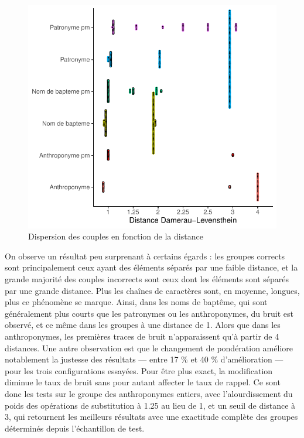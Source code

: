 \begin{figure}[ht] %
    \centering
    \includegraphics[scale=1.2]{3.Results/Img/Dotplot.pdf}
    \caption{Dispersion des couples en fonction de la distance}
    \label{graph_dispertion_cluster}
\end{figure}

On observe un résultat peu surprenant à certains égards : les groupes corrects sont principalement ceux ayant des éléments séparés par une faible distance, et la grande majorité des couples incorrects sont ceux dont les éléments sont séparés par une grande distance. 
Plus les chaînes de caractères sont, en moyenne, longues, plus ce phénomène se marque.
Ainsi, dans les noms de baptême, qui sont généralement plus courts que les patronymes ou les anthroponymes, du bruit est observé, et ce même dans les groupes à une distance de 1. Alors que dans les anthroponymes, les premières traces de bruit n'apparaissent qu’à partir de 4 distances.
Une autre observation est que le changement de pondération améliore notablement la justesse des résultats --- entre 17 \% et 40 \% d'amélioration  --- pour les trois configurations essayées. Pour être plus exact, la modification diminue le taux de bruit sans pour autant affecter le taux de rappel.
Ce sont donc les tests sur le groupe des anthroponymes entiers, avec l'alourdissement du poids des opérations de substitution à 1.25 au lieu de 1, et un seuil de distance à 3, qui retournent les meilleurs résultats avec une exactitude complète des groupes déterminés depuis l'échantillon de test.


